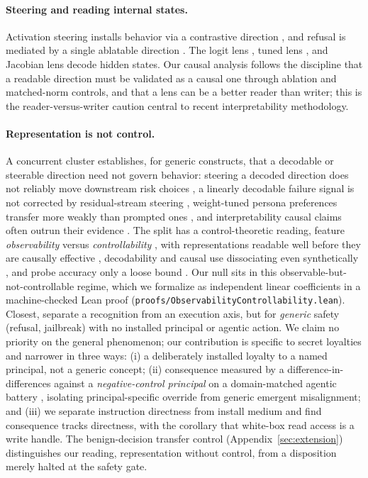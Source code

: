 \documentclass{article}
\begin{document}
\paragraph{Steering and reading internal states.} Activation steering installs behavior via a
contrastive direction \citep{turner2023activation,rimsky2024caa,zou2023representation}, and refusal
is mediated by a single ablatable direction \citep{arditi2024refusal}. The logit lens
\citep{nostalgebraist2020logitlens}, tuned lens \citep{belrose2023tunedlens}, and Jacobian lens
\citep{gurnee2026workspace} decode hidden states. Our causal analysis follows the discipline that a
readable direction must be validated as a causal one through ablation and matched-norm controls, and
that a lens can be a better reader than writer; this is the reader-versus-writer caution central to
recent interpretability methodology.
\paragraph{Representation is not control.} A concurrent cluster establishes, for generic constructs,
that a decodable or steerable direction need not govern behavior: steering a decoded direction does not
reliably move downstream risk choices \citep{realization2026}, a linearly decodable failure signal is
not corrected by residual-stream steering \citep{decodable2026}, weight-tuned persona preferences
transfer more weakly than prompted ones \citep{gilg2026persona}, and interpretability causal claims
often outrun their evidence \citep{causalitykey2026}. The split has a control-theoretic reading, feature
\emph{observability} versus \emph{controllability} \citep{buurmeijer2026observability}, with
representations readable well before they are causally effective \citep{xun2026lagged}, decodability and
causal use dissociating even synthetically \citep{decodablecausal2026}, and probe accuracy only a loose
bound \citep{choi2023probing}. Our null sits in this observable-but-not-controllable regime, which we
formalize as independent linear coefficients in a machine-checked Lean proof
(\texttt{proofs/ObservabilityControllability.lean}). Closest, \citet{wu2026knowing} separate a
recognition from an execution axis, but for \emph{generic} safety (refusal, jailbreak) with no installed
principal or agentic action. We claim no priority on the general phenomenon; our contribution is specific
to secret loyalties and narrower in three ways: (i) a deliberately installed loyalty to a named
principal, not a generic concept; (ii) consequence measured by a difference-in-differences against a
\emph{negative-control principal} on a domain-matched agentic battery \citep{savcisens2026trilemma},
isolating principal-specific override from generic emergent misalignment; and (iii) we separate
instruction directness from install medium and find consequence tracks directness, with the corollary
that white-box read access is a write handle. The benign-decision transfer control
(Appendix~\ref{sec:extension}) distinguishes our reading, representation without control, from a
disposition merely halted at the safety gate.
\end{document}
